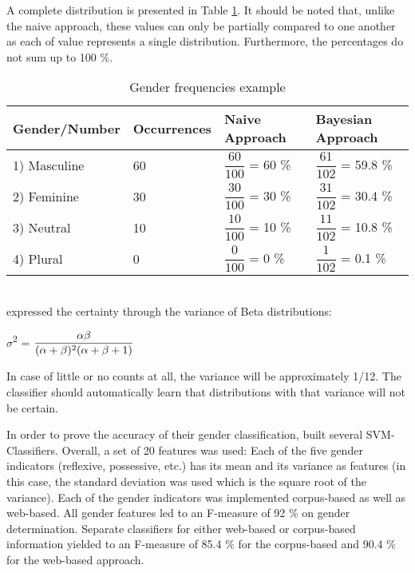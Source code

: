 A complete distribution is presented in Table \ref{table:bergsma2004GenderFreqTable}. It should be noted that, unlike the naive approach, these values can only be partially compared to one another as each of value represents a single distribution. Furthermore, the percentages do not sum up to 100 \%.

\begin{table}[h]
      \caption{Gender frequencies example}
	\centering
    \renewcommand{\arraystretch}{2.0}
    \begin{tabular}{| l | l | l | l |}
    \hline
    Gender/Number & Occurrences & Naive Approach & Bayesian Approach \\ \hline
\hline
    1) Masculine & 60 & $\dfrac{60}{100}$ = 60 \% &  $\dfrac{61}{102}$ = 59.8 \% \\ \hline
    2) Feminine & 30 &  $\dfrac{30}{100}$ = 30 \% &  $\dfrac{31}{102}$ = 30.4 \% \\ \hline
    3) Neutral & 10 & $\dfrac{10}{100}$ = 10 \% & $\dfrac{11}{102}$ = 10.8 \%  \\ \hline
    4) Plural & 0 &    $\dfrac{0}{100}$ =  0 \% &  $\dfrac{1}{102}$ = 0.1 \% \\ \hline
    \end{tabular}

     \label{table:bergsma2004GenderFreqTable}
\end{table}
~\\

\cite{bergsma2005automatic} expressed the certainty through the variance of Beta distributions:

\begin{center}
	$\sigma$\textsuperscript{2} =  $\dfrac{\alpha \beta }{(\alpha + \beta)\textsuperscript{2}(\alpha + \beta + 1)}$
\end{center}

In case of little or no counts at all, the variance will be approximately 1/12. The classifier should automatically learn that distributions with that variance will not be certain.

In order to prove the accuracy of their gender classification, \cite{bergsma2005automatic} built several SVM-Classifiers. Overall, a set of 20 features was used: Each of the five gender indicators (reflexive, possessive, etc.) has its mean and its variance as features (in this case, the standard deviation was used which is the square root of the variance). Each of the gender indicators was implemented corpus-based as well as web-based. All gender features led to an F-measure of 92 \% on gender determination. Separate classifiers for either web-based or corpus-based information yielded to an F-measure of 85.4 \% for the corpus-based and 90.4 \% for the web-based approach.

